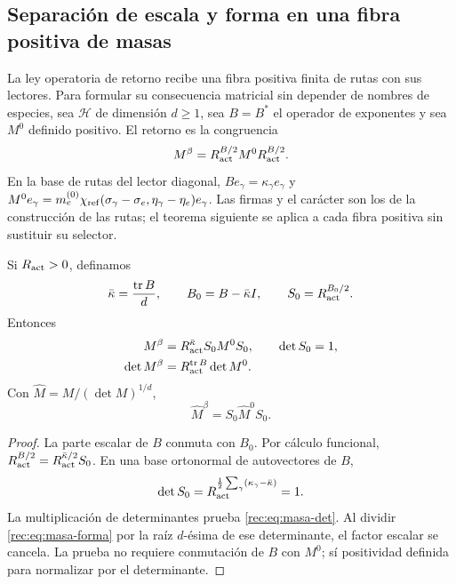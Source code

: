\subsection{Separación de escala y forma en una fibra positiva de masas}

La ley operatoria de retorno recibe una fibra positiva finita de rutas con sus lectores. Para formular su consecuencia matricial sin depender de nombres de especies, sea \(\mathcal H\) de dimensión \(d\ge1\), sea \(B=B^*\) el operador de exponentes y sea \(M^0\) definido positivo. El retorno es la congruencia
\begin{equation}
 M^\beta=R_{\rm act}^{B/2}M^0R_{\rm act}^{B/2}.
 \label{rec:eq:masa-operador}
\end{equation}
En la base de rutas del lector diagonal, \(Be_\gamma=\kappa_\gamma e_\gamma\) y
\(M^0e_\gamma=m_e^{(0)}\chi_{\rm ref}(\sigma_\gamma-\sigma_e,\eta_\gamma-\eta_e)e_\gamma\). Las firmas y el carácter son los de la construcción de las rutas; el teorema siguiente se aplica a cada fibra positiva sin sustituir su selector.

\begin{theorem}
\label{rec:thm:masa}
Si \(R_{\rm act}>0\), definamos
\[
 \bar\kappa=\frac{\operatorname{tr} B}{d},\qquad B_0=B-\bar\kappa I,
 \qquad S_0=R_{\rm act}^{B_0/2}.
\]
Entonces
\begin{align}
 M^\beta&=R_{\rm act}^{\bar\kappa}S_0M^0S_0,
 \qquad\det S_0=1,\label{rec:eq:masa-forma}\\
 \det M^\beta&=R_{\rm act}^{\operatorname{tr} B}\det M^0.\label{rec:eq:masa-det}
\end{align}
Con \(\widehat M=M/(\det M)^{1/d}\),
\begin{equation}
 \widehat M^\beta=S_0\widehat M^0S_0.
 \label{rec:eq:masa-normalizada}
\end{equation}
\end{theorem}
\begin{proof}
La parte escalar de \(B\) conmuta con \(B_0\). Por cálculo funcional,
\(R_{\rm act}^{B/2}=R_{\rm act}^{\bar\kappa/2}S_0\). En una base ortonormal de autovectores de \(B\),
\[
 \det S_0=R_{\rm act}^{\frac12\sum_\gamma(\kappa_\gamma-\bar\kappa)}=1.
\]
La multiplicación de determinantes prueba \eqref{rec:eq:masa-det}. Al dividir \eqref{rec:eq:masa-forma} por la raíz \(d\)-ésima de ese determinante, el factor escalar se cancela. La prueba no requiere conmutación de \(B\) con \(M^0\); sí positividad definida para normalizar por el determinante.
\end{proof}

